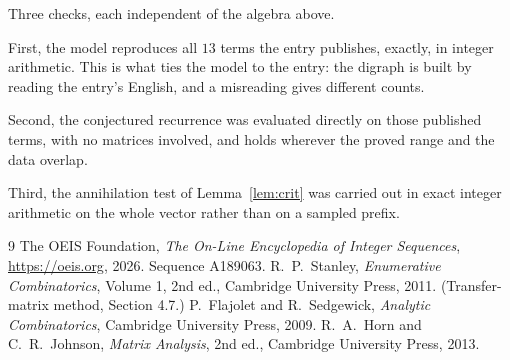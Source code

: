 \documentclass[11pt,a4paper]{article}
\theoremstyle{plain}
\theoremstyle{definition}
\begin{document}
Three checks, each independent of the algebra above.

First, the model reproduces all $13$ terms the entry publishes, exactly, in integer
arithmetic. This is what ties the model to the entry: the digraph is built by reading the
entry's English, and a misreading gives different counts.

Second, the conjectured recurrence was evaluated directly on those published terms, with no
matrices involved, and holds wherever the proved range and the data overlap.

Third, the annihilation test of Lemma~\ref{lem:crit} was carried out in exact integer
arithmetic on the whole vector rather than on a sampled prefix.

\begin{thebibliography}{9}
 The OEIS Foundation, \emph{The On-Line Encyclopedia of Integer
Sequences}, \url{https://oeis.org}, 2026. Sequence A189063.
 R.~P.~Stanley, \emph{Enumerative Combinatorics}, Volume 1, 2nd ed.,
Cambridge University Press, 2011. (Transfer-matrix method, Section 4.7.)
 P.~Flajolet and R.~Sedgewick, \emph{Analytic Combinatorics}, Cambridge
University Press, 2009.
 R.~A.~Horn and C.~R.~Johnson, \emph{Matrix Analysis}, 2nd ed., Cambridge
University Press, 2013.
\end{thebibliography}
\end{document}
